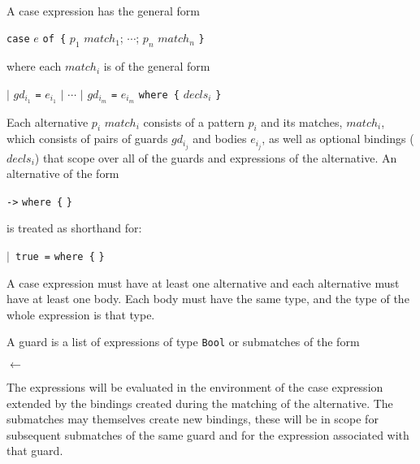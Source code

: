 \begin{flushleft}
     \bracea{}  \bracez{}\\
  \sym{->} 
  \alt {} 
  \alt {}  \bracea{}  \bracez{}\\
 \\
 \sym{$|$}  \sym{=} 
\end{flushleft}

A case expression has the general form
\begin{center}
\texttt{case} $e$ \texttt{of \{} $p_1$ $match_1$; $\cdots$; $p_n$ $match_n$ \texttt{\}}
\end{center}
where each $match_i$ is of the general form
\begin{center}
\texttt{$|$} $gd_{i_1}$ \texttt{=} $e_{i_1}$
\texttt{$|$} $\cdots$
\texttt{$|$} $gd_{i_m}$ \texttt{=} $e_{i_m}$
\texttt{where \{} $decls_i$ \texttt{\}}
\end{center}
Each alternative $p_i$ $match_i$ consists of a pattern $p_i$ and its matches, $match_i$, which consists of pairs of guards $gd_{i_j}$ and bodies $e_{i_j}$, as well as optional bindings ($decls_i$) that scope over all of the guards and expressions of the alternative.
An alternative of the form
\begin{center}
 \texttt{->}  \texttt{where \{}  \texttt{\}}
\end{center}
is treated as shorthand for:
\begin{center}
 \texttt{$|$ true =}  \texttt{where \{}  \texttt{\}}
\end{center}


A case expression must have at least one alternative and each alternative must have at least one body.
Each body must have the same type, and the type of the whole expression is that type.

A guard is a list of expressions of type \texttt{Bool} or submatches of the form
\begin{center}
 \texttt{$\leftarrow$} 
\end{center}
The expressions will be evaluated in the environment of the case expression extended by the bindings created during the matching of the alternative.
The submatches may themselves create new bindings, these will be in scope for subsequent submatches of the same guard and for the expression associated with that guard.

